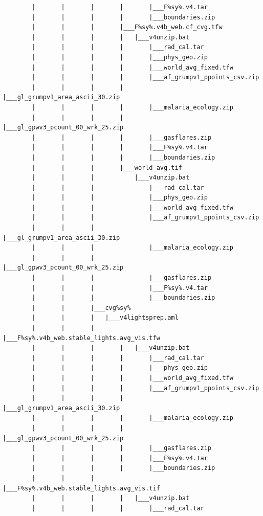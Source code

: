 \documentclass[]{book}
\begin{document}
\begin{verbatim}
        |       |       |       |       |___F%sy%.v4.tar
        |       |       |       |       |___boundaries.zip
        |       |       |       |___F%sy%.v4b_web.cf_cvg.tfw
        |       |       |       |   |___v4unzip.bat
        |       |       |       |       |___rad_cal.tar
        |       |       |       |       |___phys_geo.zip
        |       |       |       |       |___world_avg_fixed.tfw
        |       |       |       |       |___af_grumpv1_ppoints_csv.zip
        |       |       |       |       |___gl_grumpv1_area_ascii_30.zip
        |       |       |       |       |___malaria_ecology.zip
        |       |       |       |       |___gl_gpwv3_pcount_00_wrk_25.zip
        |       |       |       |       |___gasflares.zip
        |       |       |       |       |___F%sy%.v4.tar
        |       |       |       |       |___boundaries.zip
        |       |       |       |___world_avg.tif
        |       |       |           |___v4unzip.bat
        |       |       |               |___rad_cal.tar
        |       |       |               |___phys_geo.zip
        |       |       |               |___world_avg_fixed.tfw
        |       |       |               |___af_grumpv1_ppoints_csv.zip
        |       |       |               |___gl_grumpv1_area_ascii_30.zip
        |       |       |               |___malaria_ecology.zip
        |       |       |               |___gl_gpwv3_pcount_00_wrk_25.zip
        |       |       |               |___gasflares.zip
        |       |       |               |___F%sy%.v4.tar
        |       |       |               |___boundaries.zip
        |       |       |___cvg%sy%
        |       |       |   |___v4lightsprep.aml
        |       |       |       |___F%sy%.v4b_web.stable_lights.avg_vis.tfw
        |       |       |       |   |___v4unzip.bat
        |       |       |       |       |___rad_cal.tar
        |       |       |       |       |___phys_geo.zip
        |       |       |       |       |___world_avg_fixed.tfw
        |       |       |       |       |___af_grumpv1_ppoints_csv.zip
        |       |       |       |       |___gl_grumpv1_area_ascii_30.zip
        |       |       |       |       |___malaria_ecology.zip
        |       |       |       |       |___gl_gpwv3_pcount_00_wrk_25.zip
        |       |       |       |       |___gasflares.zip
        |       |       |       |       |___F%sy%.v4.tar
        |       |       |       |       |___boundaries.zip
        |       |       |       |___F%sy%.v4b_web.stable_lights.avg_vis.tif
        |       |       |       |   |___v4unzip.bat
        |       |       |       |       |___rad_cal.tar

\end{verbatim}
\end{document}
